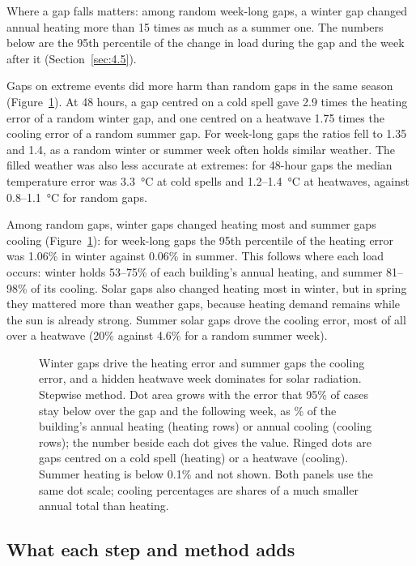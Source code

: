 Where a gap falls matters: among random week-long gaps, a winter gap changed annual heating more than 15 times as much as a summer one. The numbers below are the 95th percentile of the change in load during the gap and the week after it (Section~\ref{sec:4.5}).

Gaps on extreme events did more harm than random gaps in the same season (Figure~\ref{fig:10}). At 48 hours, a gap centred on a cold spell gave 2.9 times the heating error of a random winter gap, and one centred on a heatwave 1.75 times the cooling error of a random summer gap. For week-long gaps the ratios fell to 1.35 and 1.4, as a random winter or summer week often holds similar weather. The filled weather was also less accurate at extremes: for 48-hour gaps the median temperature error was 3.3~°C at cold spells and 1.2--1.4~°C at heatwaves, against 0.8--1.1~°C for random gaps.

Among random gaps, winter gaps changed heating most and summer gaps cooling (Figure~\ref{fig:10}): for week-long gaps the 95th percentile of the heating error was 1.06\% in winter against 0.06\% in summer. This follows where each load occurs: winter holds 53--75\% of each building's annual heating, and summer 81--98\% of its cooling. Solar gaps also changed heating most in winter, but in spring they mattered more than weather gaps, because heating demand remains while the sun is already strong. Summer solar gaps drove the cooling error, most of all over a heatwave (20\% against 4.6\% for a random summer week).

\begin{figure}[tbp]
\centering
{}
\caption{Winter gaps drive the heating error and summer gaps the cooling error, and a hidden heatwave week dominates for solar radiation. Stepwise method. Dot area grows with the error that 95\% of cases stay below over the gap and the following week, as \% of the building's annual heating (heating rows) or annual cooling (cooling rows); the number beside each dot gives the value. Ringed dots are gaps centred on a cold spell (heating) or a heatwave (cooling). Summer heating is below 0.1\% and not shown. Both panels use the same dot scale; cooling percentages are shares of a much smaller annual total than heating.}
\label{fig:10}
\end{figure}

\subsection{What each step and method adds}\label{sec:5.6}

